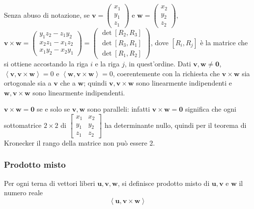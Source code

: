 \documentclass{article}
\begin{document}
Senza abuso di notazione, se $\mathbf{v}=\left( 
\begin{array}{c}
x_{1} \\ 
y_{1} \\ 
z_{1}%
\end{array}%
\right) $ e $\mathbf{w}=\left( 
\begin{array}{c}
x_{2} \\ 
y_{2} \\ 
z_{2}%
\end{array}%
\right) $, $\mathbf{v\times w}=\left( 
\begin{array}{c}
y_{1}z_{2}-z_{1}y_{2} \\ 
x_{2}z_{1}-x_{1}z_{2} \\ 
x_{1}y_{2}-x_{2}y_{1}%
\end{array}%
\right) =\left( 
\begin{array}{c}
\det \left[ R_{2},R_{3}\right] \\ 
\det \left[ R_{3},R_{1}\right] \\ 
\det \left[ R_{1},R_{2}\right]%
\end{array}%
\right) $, dove $\left[ R_{i},R_{j}\right] $ \`{e} la matrice che si ottiene
accostando la riga $i$ e la riga $j$, in quest'ordine. Dati $\mathbf{v,w\neq
0}$, $\left\langle \mathbf{v},\mathbf{v\times w}\right\rangle =0$ e $%
\left\langle \mathbf{w},\mathbf{v\times w}\right\rangle =0$, coerentemente
con la richiesta che $\mathbf{v}\times \mathbf{w}$ sia ortogonale sia a $%
\mathbf{v}$ che a $\mathbf{w}$; quindi $\mathbf{v,v\times w}$ sono
linearmente indipendenti e $\mathbf{w,v\times w}$ sono linearmente
indipendenti.

$\mathbf{v\times w=0}$ se e solo se $\mathbf{v,w}$ sono paralleli: infatti $%
\mathbf{v\times w=0}$ significa che ogni sottomatrice $2\times 2$ di $\left[ 
\begin{array}{cc}
x_{1} & x_{2} \\ 
y_{1} & y_{2} \\ 
z_{1} & z_{2}%
\end{array}%
\right] $ ha determinante nullo, quindi per il teorema di Kronecker il rango
della matrice non pu\`{o} essere $2$.

\subsubsection{Prodotto misto}

Per ogni terna di vettori liberi $\mathbf{u,v,w}$, si definisce prodotto
misto di $\mathbf{u,v}$ e $\mathbf{w}$ il numero reale 
\begin{equation*}
\left\langle \mathbf{u,v\times w}\right\rangle
\end{equation*}
\end{document}
